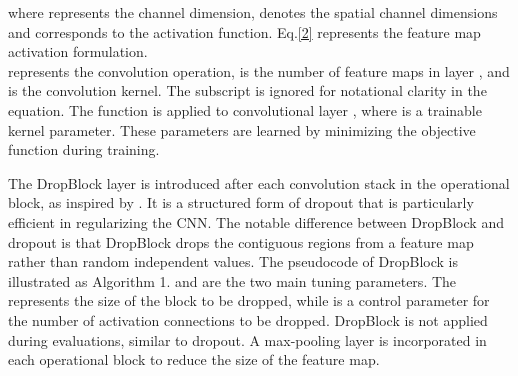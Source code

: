 \documentclass[journal]{IEEEtran}
\begin{document}
where  represents the channel dimension,  denotes the spatial channel dimensions and  corresponds to the activation function. Eq.\ref{2} represents the feature map activation formulation. \\

 represents the convolution operation,  is the number of feature maps in layer , and  is the convolution kernel. The subscript  is ignored for notational clarity in the equation. The function  is applied to convolutional layer , where  is a trainable kernel parameter. These parameters are learned by minimizing the objective function during training.
\par
The DropBlock layer is introduced after each convolution stack in the operational block, as inspired by \cite{DB}. It is a structured form of dropout that is particularly efficient in regularizing the CNN. The notable difference between DropBlock and dropout is that DropBlock drops the contiguous regions from a feature map rather than random independent values. The pseudocode of DropBlock is illustrated as Algorithm 1.  and  are the two main tuning parameters. The  represents the size of the block to be dropped, while  is a control parameter for the number of activation connections to be dropped. DropBlock is not applied during evaluations, similar to dropout. A max-pooling layer is incorporated in each operational block to reduce the size of the feature map.
\end{document}
